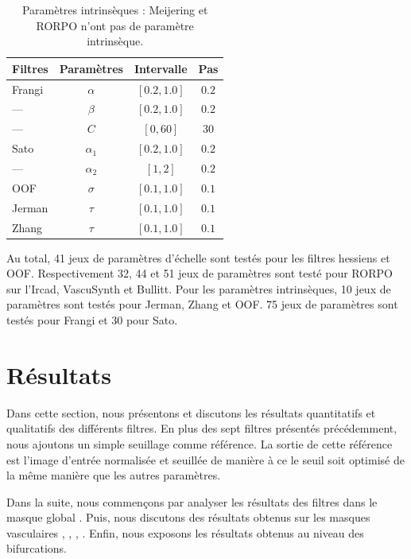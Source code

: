 \begin{table}[H]
  \caption{Paramètres intrinsèques : Meijering et RORPO n'ont pas de paramètre intrinsèque.}
  \label{table:PS_interval}
  \begin{center}
    \begin{tabular}{  l  c  c  c }
      \hline
      Filtres & Paramètres & Intervalle & Pas \\
      \hline
      Frangi & $\alpha$ & $[0.2,1.0]$ & $0.2$ \\
      ---       & $\beta$ & $[0.2,1.0]$ & $0.2$  \\
      ---       & $C$& $[0,60]$ & $30$ \\
      Sato & $\alpha_{1}$ & $[0.2,1.0]$ & $0.2$ \\
      ---     & $\alpha_{2}$ & $[1,2]$ & $0.2$ \\
      OOF & $\sigma$ & $[0.1,1.0]$ & $0.1$ \\
      Jerman & $\tau$ & $[0.1,1.0]$ & $0.1$ \\
      Zhang & $\tau$& $[0.1,1.0]$ & $0.1$ \\
      \hline
    \end{tabular}
  \end{center}
\end{table}
  
Au total, 41 jeux de paramètres d'échelle sont testés pour les filtres hessiens et OOF. Respectivement 32, 44 et 51 jeux de paramètres sont testé pour RORPO sur l'Ircad, VascuSynth et Bullitt. Pour les paramètres intrinsèques, 10 jeux de paramètres sont testés pour Jerman, Zhang et OOF. 75 jeux de paramètres sont testés pour Frangi et 30 pour Sato.


\section{Résultats}

Dans cette section, nous présentons et discutons les résultats quantitatifs et qualitatifs des différents filtres. En plus des sept filtres présentés précédemment, nous ajoutons un simple seuillage comme référence. La sortie de cette référence est l'image d'entrée normalisée et seuillée de manière à ce le seuil soit optimisé de la même manière que les autres paramètres.

Dans la suite, nous commençons par analyser les résultats des filtres dans le masque global \maskglobal. Puis, nous discutons des résultats obtenus sur les masques vasculaires \maskvascular, \maskvesselLarge, \maskvesselMedium, \maskvesselSmall. Enfin, nous exposons les résultats obtenus au niveau des bifurcations.

